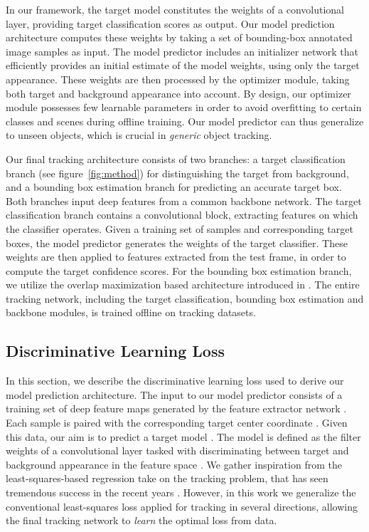 \documentclass[10pt,twocolumn,letterpaper]{article}
\begin{document}
In our framework, the target model constitutes the weights of a convolutional layer, providing target classification scores as output. Our model prediction architecture computes these weights by taking a set of bounding-box annotated image samples as input. The model predictor includes an initializer network that efficiently provides an initial estimate of the model weights, using only the target appearance. These weights are then processed by the optimizer module, taking both target and background appearance into account. By design, our optimizer module possesses few learnable parameters in order to avoid overfitting to certain classes and scenes during offline training. Our model predictor can thus generalize to unseen objects, which is crucial in \emph{generic} object tracking. 

Our final tracking architecture consists of two branches: a target classification branch (see figure~\ref{fig:method}) for distinguishing the target from background, and a bounding box estimation branch for predicting an accurate target box. 
Both branches input deep features from a common backbone network. The target classification branch contains a convolutional block, extracting features on which the classifier operates. Given a training set of samples and corresponding target boxes, the model predictor generates the weights of the target classifier. These weights are then applied to features extracted from the test frame, in order to compute the target confidence scores. For the bounding box estimation branch, we utilize the overlap maximization based architecture introduced in \cite{ATOM}. The entire tracking network, including the target classification, bounding box estimation and backbone modules, is trained offline on tracking datasets. 




\subsection{Discriminative Learning Loss}
\label{sec:disc_learn_loss}

In this section, we describe the discriminative learning loss used to derive our model prediction architecture. The input to our model predictor  consists of a training set  of deep feature maps  generated by the feature extractor network . Each sample is paired with the corresponding target center coordinate . Given this data, our aim is to predict a target model . The model  is defined as the filter weights of a convolutional layer tasked with discriminating between target and background appearance in the feature space . We gather inspiration from the least-squares-based regression take on the tracking problem, that has seen tremendous success in the recent years \cite{ATOM,DanelljanCVPR2017,Henriques14}. However, in this work we generalize the conventional least-squares loss applied for tracking in several directions, allowing the final tracking network to \emph{learn} the optimal loss from data.
\end{document}
